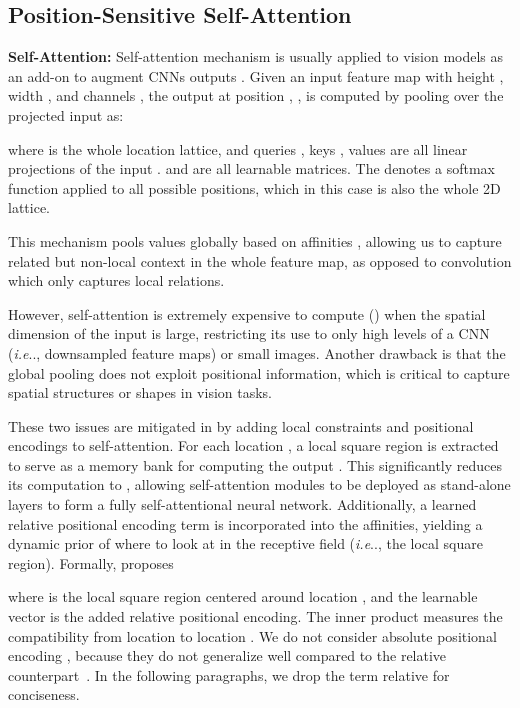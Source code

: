 \documentclass[runningheads]{llncs}
\makeatletter
\DeclareRobustCommand\onedot{\futurelet\@let@token\@onedot}
\def\@onedot{\ifx\@let@token.\else.\null\fi\xspace}
\def\ie{\emph{i.e}\onedot} \def\Ie{\emph{I.e}\onedot}
\makeatother
\begin{document}
\subsection{Position-Sensitive Self-Attention}
{\bf Self-Attention:} Self-attention mechanism is usually applied to vision models as an add-on to augment CNNs outputs  \cite{wang2018non,zhang2018self,huang2019ccnet}. Given an input feature map  with height , width , and channels , the output at position , , is computed by pooling over the projected input as:

where  is the whole location lattice, and queries , keys , values  are all linear projections of the input .  and  are all learnable matrices. The  denotes a softmax function applied to all possible  positions, which in this case is also the whole 2D lattice.

This mechanism pools values  globally based on affinities , allowing us to capture related but non-local context in the whole feature map, as opposed to convolution which only captures local relations.

However, self-attention is extremely expensive to compute () when the spatial dimension of the input is large, restricting its use to only high levels of a CNN (\ie, downsampled feature maps) or small images. Another drawback is that the global pooling does not exploit positional information, which is critical to capture spatial structures or shapes in vision tasks.

These two issues are mitigated in \cite{parmar2019stand} by adding local constraints and positional encodings to self-attention. For each location , a local  square region is extracted to serve as a memory bank for computing the output . This significantly reduces its computation to , allowing self-attention modules to be deployed as stand-alone layers to form a fully self-attentional neural network. Additionally, a learned relative positional encoding term is incorporated into the affinities, yielding a dynamic prior of where to look at in the receptive field (\ie, the local  square region). Formally, \cite{parmar2019stand} proposes

where  is the local  square region centered around location , and the learnable vector  is the added relative positional encoding. The inner product  measures the compatibility from location  to location . We do not consider absolute positional encoding , because they do not generalize well compared to the relative counterpart~\cite{parmar2019stand}. In the following paragraphs, we drop the term relative for conciseness.
\end{document}
